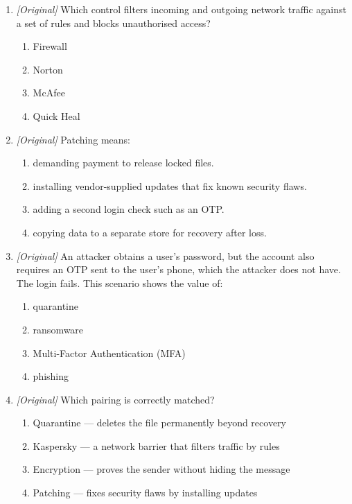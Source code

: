 \begin{enumerate}[label=\textbf{Q\arabic*.}, leftmargin=*]
\begin{enumerate}[label=\Alph*.]
    \item files already infected on the disk, by cleaning the malware.
    \item data in transit, by providing a secure encrypted channel.
    \item login accounts, by demanding an OTP at every step.
    \item software flaws, by installing vendor-supplied updates.
  \end{enumerate}
\item \textit{[Original]} Which control filters incoming and outgoing
  network traffic against a set of rules and blocks unauthorised access?
  \begin{enumerate}[label=\Alph*.]
    \item Firewall
    \item Norton
    \item McAfee
    \item Quick Heal
  \end{enumerate}
\item \textit{[Original]} Patching means:
  \begin{enumerate}[label=\Alph*.]
    \item demanding payment to release locked files.
    \item installing vendor-supplied updates that fix known security flaws.
    \item adding a second login check such as an OTP.
    \item copying data to a separate store for recovery after loss.
  \end{enumerate}
\item \textit{[Original]} An attacker obtains a user's password, but the
  account also requires an OTP sent to the user's phone, which the attacker
  does not have. The login fails. This scenario shows the value of:
  \begin{enumerate}[label=\Alph*.]
    \item quarantine
    \item ransomware
    \item Multi-Factor Authentication (MFA)
    \item phishing
  \end{enumerate}
\item \textit{[Original]} Which pairing is correctly matched?
  \begin{enumerate}[label=\Alph*.]
    \item Quarantine --- deletes the file permanently beyond recovery
    \item Kaspersky --- a network barrier that filters traffic by rules
    \item Encryption --- proves the sender without hiding the message
    \item Patching --- fixes security flaws by installing updates
  \end{enumerate}


\end{enumerate}
